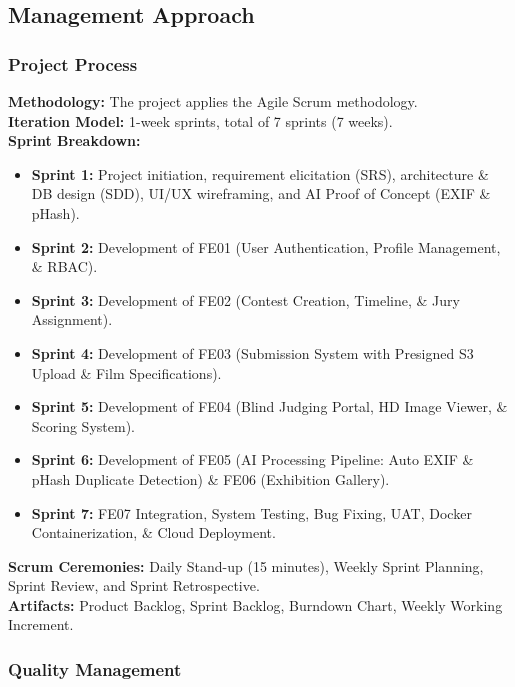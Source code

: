 \subsection{Management Approach}
\label{subsec:ii_management_approach}

\subsubsection{Project Process}
\label{subsubsec:ii_project_process}

\textbf{Methodology:} The project applies the Agile Scrum methodology.\\
\textbf{Iteration Model:} 1-week sprints, total of 7 sprints (7 weeks).\\
\textbf{Sprint Breakdown:}
\begin{itemize}[leftmargin=*, itemsep=0.3em]
    \item \textbf{Sprint 1:} Project initiation, requirement elicitation (SRS), architecture \& DB design (SDD), UI/UX wireframing, and AI Proof of Concept (EXIF \& pHash).
    \item \textbf{Sprint 2:} Development of FE01 (User Authentication, Profile Management, \& RBAC).
    \item \textbf{Sprint 3:} Development of FE02 (Contest Creation, Timeline, \& Jury Assignment).
    \item \textbf{Sprint 4:} Development of FE03 (Submission System with Presigned S3 Upload \& Film Specifications).
    \item \textbf{Sprint 5:} Development of FE04 (Blind Judging Portal, HD Image Viewer, \& Scoring System).
    \item \textbf{Sprint 6:} Development of FE05 (AI Processing Pipeline: Auto EXIF \& pHash Duplicate Detection) \& FE06 (Exhibition Gallery).
    \item \textbf{Sprint 7:} FE07 Integration, System Testing, Bug Fixing, UAT, Docker Containerization, \& Cloud Deployment.
\end{itemize}
\textbf{Scrum Ceremonies:} Daily Stand-up (15 minutes), Weekly Sprint Planning, Sprint Review, and Sprint Retrospective.\\
\textbf{Artifacts:} Product Backlog, Sprint Backlog, Burndown Chart, Weekly Working Increment.

\subsubsection{Quality Management}
\label{subsubsec:ii_quality_management}

